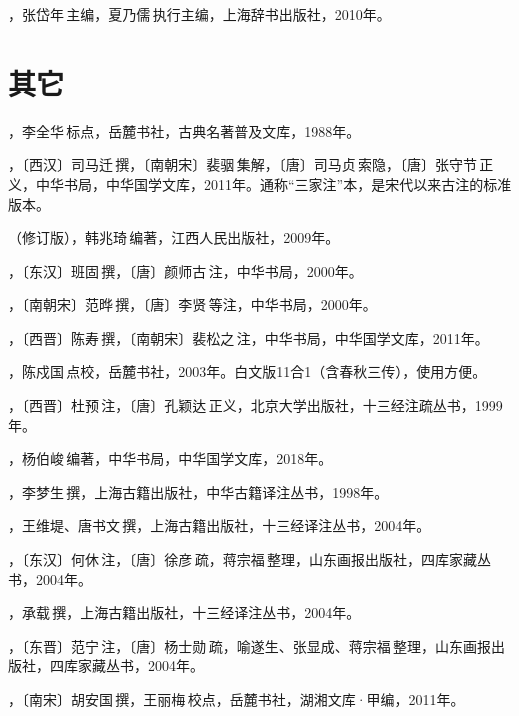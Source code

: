 ，张岱年\,主编，夏乃儒\,执行主编，上海辞书出版社，2010年。


\lypdfbookmark\section*{其它}

，李全华\,标点，岳麓书社，古典名著普及文库，1988年。

，〔西汉〕司马迁\,撰，〔南朝宋〕裴骃\,集解，〔唐〕司马贞\,索隐，〔唐〕张守节\,正义，中华书局，中华国学文库，2011年。通称“三家注”本，是宋代以来古注的标准版本。

（修订版），韩兆琦\,编著，江西人民出版社，2009年。

，〔东汉〕班固\,撰，〔唐〕颜师古\,注，中华书局，2000年。

，〔南朝宋〕范晔\,撰，〔唐〕李贤\,等注，中华书局，2000年。

，〔西晋〕陈寿\,撰，〔南朝宋〕裴松之\,注，中华书局，中华国学文库，2011年。

，陈戍国\,点校，岳麓书社，2003年。白文版11合1（含春秋三传），使用方便。

，〔西晋〕杜预\,注，〔唐〕孔颖达\,正义，北京大学出版社，十三经注疏丛书，1999年。

，杨伯峻\,编著，中华书局，中华国学文库，2018年。

，李梦生\,撰，上海古籍出版社，中华古籍译注丛书，1998年。

，王维堤、唐书文\,撰，上海古籍出版社，十三经译注丛书，2004年。

，〔东汉〕何休\,注，〔唐〕徐彦\,疏，蒋宗福\,整理，山东画报出版社，四库家藏丛书，2004年。

，承载\,撰，上海古籍出版社，十三经译注丛书，2004年。

，〔东晋〕范宁\,注，〔唐〕杨士勋\,疏，喻遂生、张显成、蒋宗福\,整理，山东画报出版社，四库家藏丛书，2004年。

，〔南宋〕胡安国\,撰，王丽梅\,校点，岳麓书社，湖湘文库·甲编，2011年。

